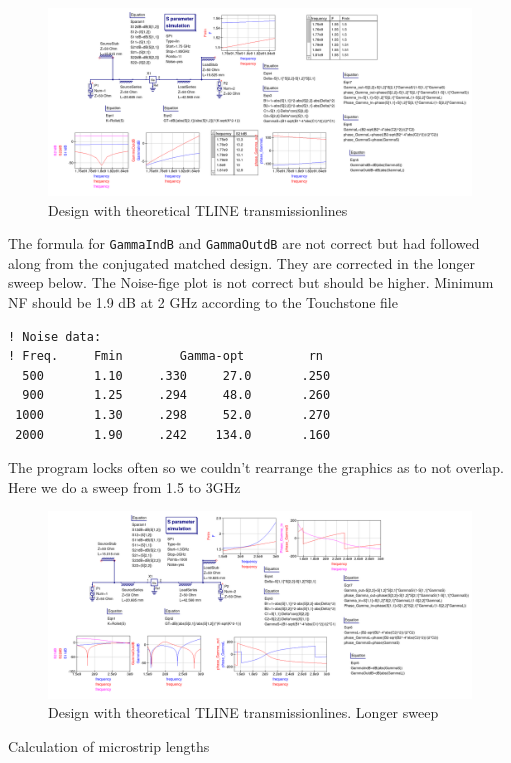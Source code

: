 \documentclass{article}
\begin{document}
\begin{figure}[H]
\centering
  \includegraphics[width=\linewidth]{X1800MHzAt13dBAt2dBNF.png}
  \caption{Design with theoretical TLINE transmissionlines}
  \label{fig4}
\end{figure}
The formula for \verb+GammaIndB+ and \verb+GammaOutdB+ are not correct but had followed along from the
conjugated matched design. They are corrected in the longer sweep below.
The Noise-fige plot is not correct but should be higher. Minimum NF should be
1.9 dB at 2 GHz according to the Touchstone file
\begin{verbatim}
! Noise data:
! Freq.     Fmin        Gamma-opt         rn
  500       1.10     .330     27.0       .250
  900       1.25     .294     48.0       .260
 1000       1.30     .298     52.0       .270
 2000       1.90     .242    134.0       .160
\end{verbatim}
The program locks often so we couldn't rearrange the graphics as to not
overlap. Here we do a sweep from 1.5 to 3GHz

\begin{figure}[H]
\centering
  \includegraphics[width=\linewidth]{X21800MHzAt13dBAt2dBNF.png}
  \caption{Design with theoretical TLINE transmissionlines. Longer sweep}
  \label{fig4}
\end{figure}

Calculation of microstrip lengths
\end{document}
